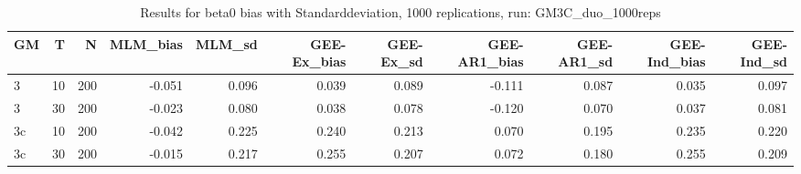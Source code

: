 \begin{table}[ht]
\centering
\begin{tabular}{lrrrrrrrrrr}
  \hline
GM & T & N & MLM\_bias & MLM\_sd & GEE-Ex\_bias & GEE-Ex\_sd & GEE-AR1\_bias & GEE-AR1\_sd & GEE-Ind\_bias & GEE-Ind\_sd \\ 
  \hline
3 & 10 & 200 & -0.051 & 0.096 & 0.039 & 0.089 & -0.111 & 0.087 & 0.035 & 0.097 \\ 
  3 & 30 & 200 & -0.023 & 0.080 & 0.038 & 0.078 & -0.120 & 0.070 & 0.037 & 0.081 \\ 
  3c & 10 & 200 & -0.042 & 0.225 & 0.240 & 0.213 & 0.070 & 0.195 & 0.235 & 0.220 \\ 
  3c & 30 & 200 & -0.015 & 0.217 & 0.255 & 0.207 & 0.072 & 0.180 & 0.255 & 0.209 \\ 
   \hline
\end{tabular}
\caption{Results for beta0 bias with Standarddeviation, 1000 replications, run: GM3C_duo_1000reps} 
\label{tab:beta0_bias_sd}
\end{table}
